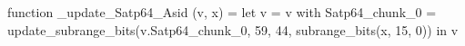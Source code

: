 function _update_Satp64_Asid (v, x) = let v = { v with Satp64_chunk_0 = update_subrange_bits(v.Satp64_chunk_0, 59, 44, subrange_bits(x, 15, 0)) } in
  v
